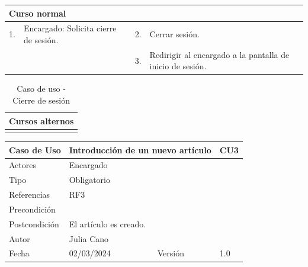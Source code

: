 \begin{table}[H]
	\centering
	\begin{tabular}{| m{} | m{} | m{} | m{} |}
		\hline
		\multicolumn{4}{|m{0.9\textwidth}|}{Curso normal}     \\ 
		\hline
		1. & Encargado: Solicita cierre de sesión. & 2. & Cerrar sesión. \\ 
		\hline
		& & 3. & Redirigir al encargado a la pantalla de inicio de sesión. \\ 
		\hline
	\end{tabular}
\end{table}

\begin{table}[H]
	\centering
	\begin{tabular}{| m{} | m{} | m{} | m{} |}
		\hline
		\multicolumn{4}{|m{0.9\textwidth}|}{Cursos alternos}     \\ 
		\hline
		 & \multicolumn{3}{m{0.67\textwidth}|}{} \\ 
		\hline
	\end{tabular}
	\caption{Caso de uso - Cierre de sesión}
\end{table}

\newpage


\begin{table}[H]
	\centering
	\begin{tabular}{| m{} | m{} | m{} | m{} |}
		\hline
		\rowcolor{grayshade} Caso de Uso & \multicolumn{2}{|l|}{Introducción de un nuevo artículo} &  CU3\\ 
		\hline
		Actores & \multicolumn{3}{l|}{Encargado} \\ 
		\hline
		Tipo & \multicolumn{3}{l|}{Obligatorio} \\ 
		\hline
		Referencias & \multicolumn{3}{l|}{RF3} \\ 
		\hline
		Precondición & \multicolumn{3}{l|}{} \\ 
		\hline
		Postcondición & \multicolumn{3}{l|}{El artículo es creado.} \\ 
		\hline
		Autor & \multicolumn{3}{l|}{Julia Cano} \\ 
		\hline
		Fecha & 02/03/2024 & Versión & 1.0 \\
		\hline
	\end{tabular}
\end{table}

